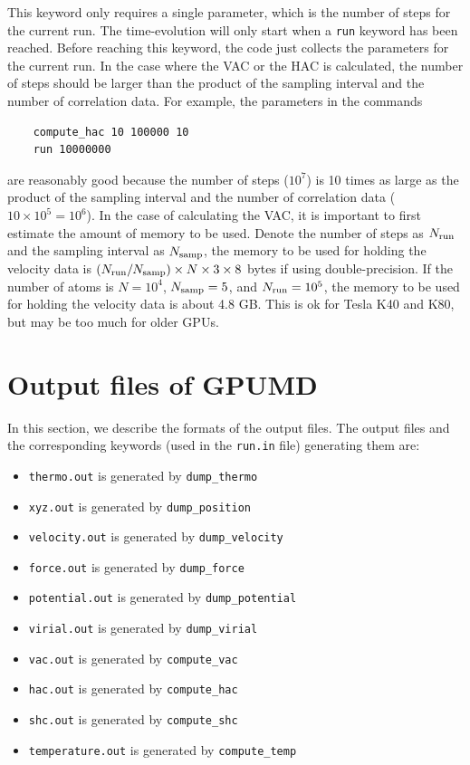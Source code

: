 \documentclass[12pt,a4paper]{report}
\begin{document}
\begin{enumerate}
This keyword only requires a single parameter, which is the number of steps for the current run. The time-evolution will only start when a \verb"run" keyword has been reached. Before reaching this keyword, the code just collects the parameters for the current run. In the case where the VAC or the HAC is calculated, the number of steps should be larger than the product of the sampling interval and the number of correlation data. For example, the parameters in the commands
\begin{verbatim}
    compute_hac 10 100000 10
    run 10000000
\end{verbatim}
are reasonably good because the number of steps ($10^7$) is 10 times as large as the product of the sampling interval and the number of correlation data ($10\times 10^5=10^6$). In the case of calculating the VAC, it is important to first estimate the amount of memory to be used. Denote the number of steps as $N_{\textmd{run}}$ and the sampling interval as $N_{\textmd{samp}}$, the memory to be used for holding the velocity data is $(N_{\textmd{run}}/N_{\textmd{samp}})\times N \times 3 \times 8$ bytes if using double-precision. If the number of atoms is $N=10^4$, $N_{\textmd{samp}}=5$, and $N_{\textmd{run}}=10^5$, the memory to be used for holding the velocity data is about 4.8 GB. This is ok for Tesla K40 and K80, but may be too much for older GPUs.
\end{enumerate}



\section{Output files of GPUMD}

In this section, we describe the formats of the output files. The output files and the corresponding keywords (used in the \verb"run.in" file) generating them are:
\begin{itemize}
\item \verb"thermo.out" is generated by \verb"dump_thermo"
\item \verb"xyz.out" is generated by \verb"dump_position"
\item \verb"velocity.out" is generated by \verb"dump_velocity"
\item \verb"force.out" is generated by \verb"dump_force"
\item \verb"potential.out" is generated by \verb"dump_potential"
\item \verb"virial.out" is generated by \verb"dump_virial"
\item \verb"vac.out" is generated by \verb"compute_vac"
\item \verb"hac.out" is generated by \verb"compute_hac"
\item \verb"shc.out" is generated by \verb"compute_shc"
\item \verb"temperature.out" is generated by \verb"compute_temp"
\end{itemize}
\end{document}
